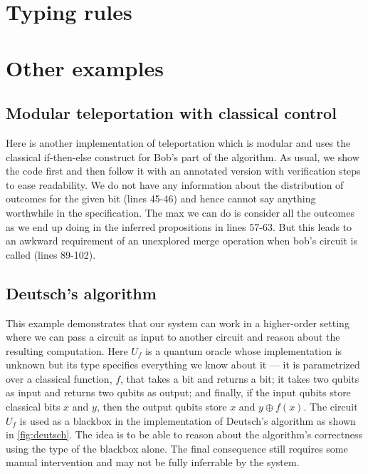 \documentclass[adraft,creativecommons]{eptcs}
\theoremstyle{definition}
\theoremstyle{remark}
\begin{document}

\section{Typing rules}


\section{Other examples}

\subsection{Modular teleportation with classical control}

Here is another implementation of teleportation which is modular and uses the classical if-then-else construct for Bob's part of the algorithm. As usual, we show the code first and then follow it with an annotated version with verification steps to ease readability. We do not have any information about the distribution of outcomes for the given bit (lines 45-46) and hence cannot say anything worthwhile in the specification. The max we can do is consider all the outcomes as we end up doing in the inferred propositions in lines 57-63. But this leads to an awkward requirement of an unexplored merge operation when bob's circuit is called (lines 89-102).



\subsection{Deutsch's algorithm}
This example demonstrates that our system can work in a higher-order setting where we can pass a circuit as input to another circuit and reason about the resulting computation. Here $U_f$ is a quantum oracle whose implementation is unknown but its type specifies everything we know about it --- it is parametrized over a classical function, $f$, that takes a bit and returns a bit; it takes two qubits as input and returns two qubits as output; and finally, if the input qubits store classical bits $x$ and $y$, then the output qubits store $x$ and $y \oplus f(x)$. The circuit $U_f$ is used as a blackbox in the implementation of Deutsch's algorithm as shown in \cref{fig:deutsch}. The idea is to be able to reason about the algorithm's correctness using the type of the blackbox alone. The final consequence still requires some manual intervention and may not be fully inferrable by the system.
\end{document}
